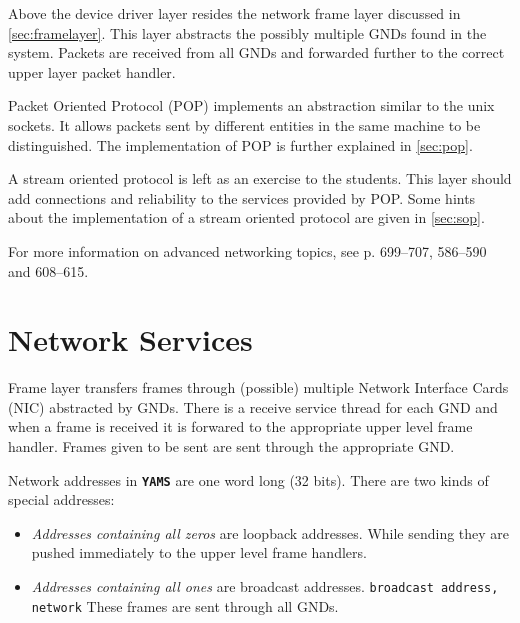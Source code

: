 \documentclass[twoside,a4paper]{report}
\newcommand{\yams}{\texttt{\textbf{YAMS}}}
\begin{document}
Above the device driver layer resides the network frame layer
discussed in \autoref{sec:framelayer}. This layer abstracts the
possibly multiple GNDs found in the system. Packets are received from
all GNDs and forwarded further to the correct upper layer packet
handler.

Packet Oriented Protocol (POP) implements an abstraction
similar to the unix sockets. It allows packets sent by different
entities in the same machine to be distinguished. The implementation
of POP is further explained in \autoref{sec:pop}.

A stream oriented protocol is left as an exercise to the
students. This layer should add connections and reliability to the
services provided by POP. Some hints about the implementation of a
stream oriented protocol are given in \autoref{sec:sop}.

For more information on advanced networking topics, see
\cite{stallings} p. 699--707, 586--590 and 608--615.

\section{Network Services}
\label{sec:framelayer}


Frame layer transfers frames through (possible) multiple Network
Interface Cards (NIC) abstracted by GNDs. There is a receive service
thread for each GND and when a frame is received it is forwared to the
appropriate upper level frame handler. Frames given to be sent are
sent through the appropriate GND.

Network addresses in \yams{} are one word long (32 bits). There are
two kinds of special addresses:
\begin{itemize}

\item \emph{Addresses containing all zeros} are loopback addresses.
 While sending they are pushed
immediately to the upper level frame handlers.

\item \emph{Addresses containing all ones} are broadcast addresses.
\texttt{broadcast address, network} These frames are sent through
all GNDs.

\end{itemize}

\end{document}
